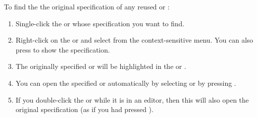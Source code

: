 To find the the original specification of any reused \gdcase{} or \gdsuite{}:
\begin{enumerate}
\item Single-click the \gdcase{} or \gdsuite{} whose specification you want to find.
\item Right-click on the \gdcase{} or \gdsuite{} and select  from the context-sensitive menu. You can also press  to show the specification.
\item The originally specified  \gdcase{} or \gdsuite{} will be highlighted in the \gdtestcasebrowser{} or \gdtestsuitebrowser{}. 
\item You can open the specified \gdcase{} or \gdsuite{} automatically by selecting  or by  pressing .
\item If you double-click the \gdcase{} or \gdsuite{} while it is in an editor, then this will also open the original specification (as if you had pressed ).
\end{enumerate}
